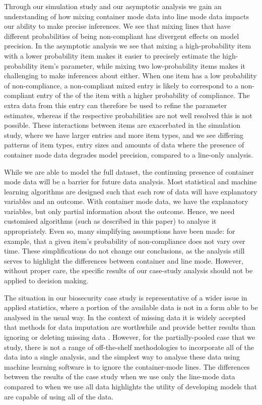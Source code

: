 \documentclass[aoas]{imsart}
\begin{document}
Through our simulation study and our asymptotic analysis we gain an understanding of how mixing container mode data into line mode data impacts our ability to make precise inferences. We see that mixing lines that have different probabilities of being non-compliant has divergent effects on model precision. In the asymptotic analysis we see that mixing a high-probability item with a lower probability item makes it easier to precisely estimate the high-probability item's parameter, while mixing two low-probability items makes it challenging to make inferences about either. {When one item has a low probability of non-compliance, a non-compliant mixed entry is likely to correspond to a non-compliant entry of the of the item with a higher probability of compliance.  The extra data from this entry can therefore be used to refine the parameter estimates, whereas if the respective probabilities are not well resolved this is not possible.} These interactions between items are exacerbated in the simulation study, where we have larger entries and more item types, and we see differing patterns of item types, entry sizes and amounts of data where the presence of container mode data degrades model precision, compared to a line-only analysis. 

While we are able to model the full dataset, the continuing presence of container mode data will be a barrier for future data analysis. Most statistical and machine learning algorithms are designed such that each row of data will have explanatory variables and an outcome. With container mode data, we have the explanatory variables, but only partial information about the outcome. Hence, we need customised algorithms (such as described in this paper) to analyse it appropriately.  {Even so, many simplifying assumptions have been made: for example, that a given item's probability of non-compliance does not vary over time. These simplifications do not change our conclusions, as the analysis still serves to highlight the differences between container and line mode. However, without proper care, the specific results of our case-study analysis should not be applied to decision making.} %

The situation in our biosecurity case study is representative of a wider issue in applied statistics, where a portion of the available data is not in a form able to be analysed in the usual way. In the context of missing data it is widely accepted that methods for data imputation are worthwhile and provide better results than ignoring or deleting missing data \citep{nakagawa_missing_2008,ren_review_2023}. However, for the partially-pooled case that we study, there is not a range of off-the-shelf methodologies to incorporate all of the data into a single analysis, and the simplest way to analyse these data using machine learning software is to ignore the container-mode lines. The differences between the results of the case study when we use only the line-mode data compared to when we use all data highlights the utility of developing models that are capable of using all of the data.
\end{document}
